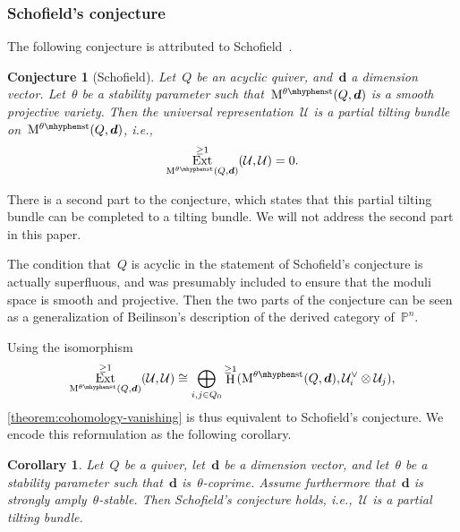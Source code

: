 \documentclass[11pt]{article}
\theoremstyle{plain}
\newtheorem{alphaconjecture}[alphatheorem]{Conjecture}
\newtheorem{alphacorollary}[alphatheorem]{Corollary}
\theoremstyle{definition}
\DeclareMathOperator\Ext{Ext}
\DeclareMathOperator\HH{H}
\newcommand\dash{\nobreakdash-\hspace{0pt}}
\newcommand\stable{\ensuremath{\mhyphen\mathrm{st}}}
\newcommand\tuple[1]{\ensuremath{{\boldsymbol{#1}}}}
\begin{document}
\subsubsection*{Schofield's conjecture}
The following conjecture is attributed to Schofield~\cite[p.\,80]{MR1428456}.
\begin{alphaconjecture}[Schofield]
\label{conjecture:schofield}
Let~$Q$ be an acyclic quiver,
and~$\tuple{d}$ a dimension vector.
Let~$\theta$ be a stability parameter
such that~$\modulispace[\theta\stable]{Q,\tuple{d}}$
is a smooth projective variety.
Then the universal representation~$\mathcal{U}$
is a partial tilting bundle on~$\modulispace[\theta\stable]{Q,\tuple{d}}$,
i.e.,
\begin{equation*}
\Ext_{\modulispace[\theta\stable]{Q,\tuple{d}}}^{\geq 1}(\mathcal{U},\mathcal{U})=0.
\end{equation*}
\end{alphaconjecture}
There is a second part to the conjecture,
which states that
this partial tilting bundle can be completed to a tilting bundle.
We will not address the second part in this paper.

The condition that~$Q$ is acyclic in the statement of Schofield's conjecture
is actually superfluous,
and was presumably included to ensure that the moduli space is smooth and projective.
Then the two parts of the conjecture can be seen as a generalization
of Beilinson's description of the derived category of~$\mathbb{P}^n$.

Using the isomorphism
\begin{equation}
\label{equation:Ext-as-cohomology}
\Ext_{\modulispace[\theta\stable]{Q,\tuple{d}}}^{\geq 1}(\mathcal{U},\mathcal{U})
\cong\bigoplus_{i,j\in Q_0}\HH^{\geq 1}(\modulispace[\theta\stable]{Q,\tuple{d}},\mathcal{U}_i^\vee\otimes\mathcal{U}_j),
\end{equation}
\cref{theorem:cohomology-vanishing}
is thus equivalent to Schofield's conjecture.
We encode this reformulation as the following corollary.

\begin{alphacorollary}
\label{corollary:schofield}
Let~$Q$ be a quiver,
let~$\tuple{d}$ be a dimension vector,
and let~$\theta$ be a stability parameter
such that~$\tuple{d}$ is~$\theta$\dash coprime.
Assume furthermore that~$\tuple{d}$ is strongly amply~$\theta$\dash stable.
Then Schofield's conjecture holds,
i.e.,~$\mathcal{U}$ is a partial tilting bundle.
\end{alphacorollary}
\end{document}
